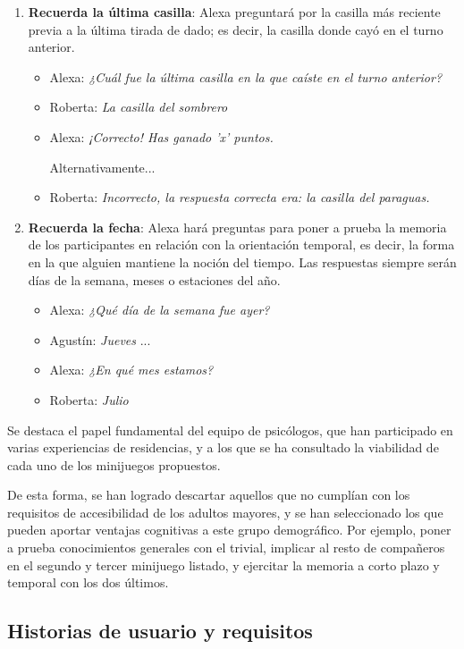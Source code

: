 \begin{enumerate}
	\item \textbf{Recuerda la última casilla}: Alexa preguntará por la casilla más reciente previa a la última tirada de dado; es decir, la casilla donde cayó en el turno anterior.
	\begin{itemize}
		\item Alexa: \textit{¿Cuál fue la última casilla en la que caíste en el turno anterior?}
		\item Roberta: \textit{La casilla del sombrero}
		\item Alexa: \textit{¡Correcto! Has ganado 'x' puntos.}
		
		Alternativamente...
		\item Roberta: \textit{Incorrecto, la respuesta correcta era: la casilla del paraguas.}
	\end{itemize}
	
	\item \textbf{Recuerda la fecha}: Alexa hará preguntas para poner a prueba la memoria de los participantes en relación con la orientación temporal, es decir, la forma en la que alguien mantiene la noción del tiempo. Las respuestas siempre serán días de la semana, meses o estaciones del año.
	\begin{itemize}
		\item Alexa: \textit{¿Qué día de la semana fue ayer?}
		\item Agustín: \textit{Jueves}
		...
		\item Alexa: \textit{¿En qué mes estamos?}
		\item Roberta: \textit{Julio}
	\end{itemize}
\end{enumerate}

Se destaca el papel fundamental del equipo de psicólogos, que han participado en varias experiencias de residencias, y a los que se ha consultado la viabilidad de cada uno de los minijuegos propuestos. 

De esta forma, se han logrado descartar aquellos que no cumplían con los requisitos de accesibilidad de los adultos mayores, y se han seleccionado los que pueden aportar ventajas cognitivas a este grupo demográfico. Por ejemplo, poner a prueba conocimientos generales con el trivial, implicar al resto de compañeros en el segundo y tercer minijuego listado, y ejercitar la memoria a corto plazo y temporal con los dos últimos.

\newpage
\subsection{Historias de usuario y requisitos}

